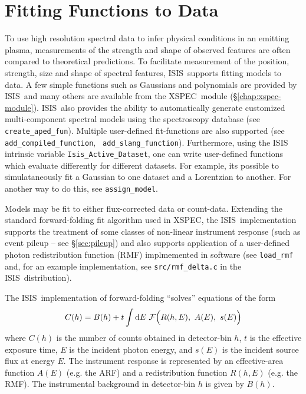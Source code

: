 \documentclass{book}
\newcommand{\D}{{\rm d}}
\newcommand{\isisx}{{\sc ISIS~}}
\newcommand{\xspec}{{\sc XSPEC}}
\begin{document}
{\newpage
\section{Fitting Functions to Data}
\label{sec:fitting-data}

To use high resolution spectral data to infer physical conditions
in an emitting plasma, measurements of the strength and shape of
observed features are often compared to theoretical predictions.
To facilitate measurement of the position, strength, size and
shape of spectral features, \isisx supports fitting models to
data.  A few simple functions such as Gaussians and polynomials
are provided by \isisx and many others are available from the
\xspec\ module (\S\ref{chap:xspec-module}).  \isisx also provides
the ability to automatically generate customized multi-component
spectral models using the spectroscopy database (see
\verb|create_aped_fun|). Multiple user-defined fit-functions are
also supported (see {\tt add\_compiled\_function}, {\tt
add\_slang\_function}). Furthermore, using the ISIS intrinsic
variable \verb|Isis_Active_Dataset|, one can write user-defined
functions which evaluate differently for different datasets. For
example, its possible to simulataneously fit a Gaussian to one
dataset and a Lorentzian to another.  For another way to do this,
see \verb|assign_model|.

Models may be fit to either flux-corrected data or count-data.
Extending the standard forward-folding fit algorithm used in \xspec,
the \isisx implementation supports the treatment of some classes of
non-linear instrument response (such as event pileup -- see
\S\ref{sec:pileup}) and also supports application of a user-defined
photon redistribution function (RMF) implmemented in software (see
{\tt load\_rmf} and, for an example implementation, see
\verb|src/rmf_delta.c| in the \isisx distribution).

The \isisx implementation of forward-folding ``solves'' equations
of the form
\begin{equation}
    C(h) = B(h) + t \int \D E~{\cal F}\Bigl(R(h,E),\ A(E),\ s(E)\Bigr)
\label{eq:model-counts}
\end{equation}
where $C(h)$ is the number of counts obtained in detector-bin $h$,
$t$ is the effective exposure time, $E$ is the incident photon energy, and
$s(E)$ is the incident source flux at energy $E$.  The instrument response
is represented by an effective-area function $A(E)$ (e.g. the ARF)
and a redistribution function $R(h, E)$ (e.g. the RMF).  The
instrumental background in detector-bin $h$ is given by $B(h)$.

}
\end{document}
